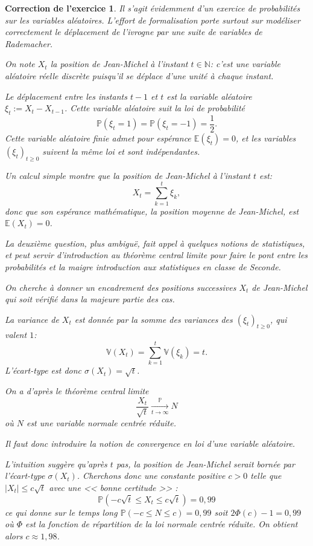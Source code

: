 \documentclass[12pt]{article}
\theoremstyle{break}
\newtheorem{cor}{Correction de l'exercice}
\newcommand{\NN}{\mathbb N}
\newcommand{\PP}{\mathbb P}
\newcommand{\EE}{\mathbb E}
\newcommand{\VV}{\mathbb V}
\begin{document}
\begin{cor}
\textit{Il s'agit évidemment d'un exercice de probabilités sur les variables aléatoires. L'effort de formalisation porte surtout sur modéliser correctement le déplacement de l'ivrogne par une suite de variables de Rademacher.}

On note $X_t$ la position de Jean-Michel à l'instant $t\in\NN$: c'est une variable aléatoire réelle discrète puisqu'il se déplace d'une unité à chaque instant.

Le déplacement entre les instants $t-1$ et $t$ est la variable aléatoire $\xi_t := X_t-X_{t-1}$. Cette variable aléatoire suit la loi de probabilité
\[
\PP(\xi_t = 1) = \PP(\xi_t = -1) = \frac{1}{2}. 
\]
Cette variable aléatoire finie admet pour espérance $\EE(\xi_t) = 0$, et les variables $(\xi_t)_{t\geq 0}$ suivent la même loi et sont indépendantes.

Un calcul simple montre que la position de Jean-Michel à l'instant $t$ est:
\[
X_t = \sum_{k=1}^t \xi_k,
\]
donc que son espérance mathématique, la position moyenne de Jean-Michel, est $\EE(X_t) = 0$.

\textit{La deuxième question, plus ambiguë, fait appel à quelques notions de statistiques, et peut servir d'introduction au théorème central limite pour faire le pont entre les probabilités et la maigre introduction aux statistiques en classe de Seconde.}

On cherche à donner un encadrement des positions successives $X_t$ de Jean-Michel qui soit vérifié dans la majeure partie des cas.

La variance de $X_t$ est donnée par la somme des variances des $(\xi_t)_{t\geq 0}$, qui valent $1$:
\[
\VV(X_t) = \sum_{k=1}^t \VV(\xi_k) = t.
\]
L'écart-type est donc $\sigma(X_t) = \sqrt{t}$.

On a d'après le théorème central limite
\[
\frac{X_t}{\sqrt{t}} \xrightarrow[t\to\infty]{\PP} N
\]
où $N$ est une variable normale centrée réduite.

\textit{Il faut donc introduire la notion de convergence en loi d'une variable aléatoire.}

L'intuition suggère qu'après $t$ pas, la position de Jean-Michel serait bornée par l'écart-type $\sigma(X_t)$. Cherchons donc une constante positive $c > 0$ telle que $|X_t| \leq c\sqrt{t}$ avec une << bonne certitude >> :
\[
\PP\left(-c\sqrt t \leq X_t \leq c\sqrt t\right) = 0,\!99
\]
ce qui donne sur le temps long $\PP(-c \leq N \leq c) = 0,\!99$ soit $2\Phi(c) - 1 = 0,\!99$ où $\Phi$ est la fonction de répartition de la loi normale centrée réduite. On obtient alors $c\approx 1,\!98$.
\end{cor}
\end{document}
